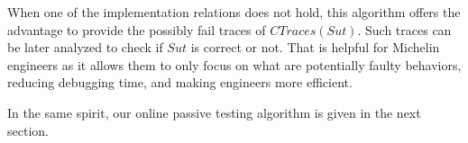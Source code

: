 When one of the implementation relations does not hold, this
algorithm offers the advantage to provide the possibly fail
traces of $CTraces({Sut})$. Such traces can be later analyzed to
check if $\mathit{Sut}$ is correct or not. That is helpful for
Michelin engineers as it allows them to only focus on what are
potentially faulty behaviors, reducing debugging time, and
making engineers more efficient.

In the same spirit, our online passive testing algorithm is given
in the next section.
